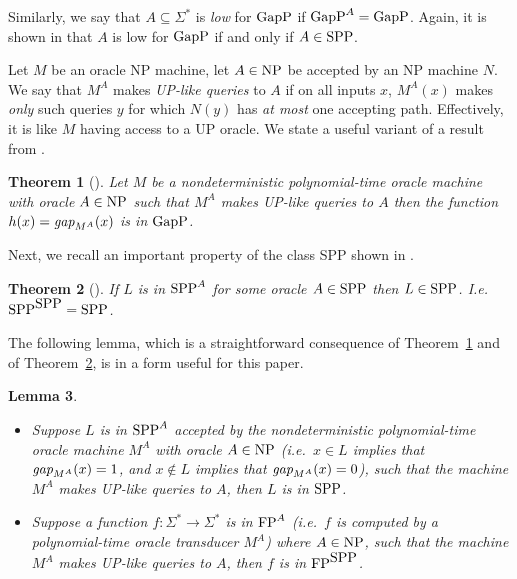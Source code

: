 \documentclass{article}
\newtheorem{theorem}{Theorem}[section]
\newtheorem{lemma}[theorem]{Lemma}
\newcommand{\GapP}{\mbox{\rm GapP}}
\newcommand{\NP}{\mbox{\rm NP}}
\newcommand{\FP}{\mbox{\rm FP}}
\newcommand{\SPP}{\mbox{\rm SPP}}
\newcommand{\gap}{\mbox{\it gap}}
\begin{document}
Similarly, we say that $A \subseteq \Sigma^*$ is {\em low} for $\GapP$
if $\GapP^A=\GapP$. Again, it is shown in \cite{fenner91gapdefinable}
that $A$ is low for $\GapP$ if and only if $A\in\SPP$.

Let $M$ be an oracle NP machine, let $A\in\NP$ be accepted by an NP
machine $N$. We say that $M^A$ makes {\em UP-like queries} to $A$ if
on all inputs $x$, $M^A(x)$ makes {\em only} such queries $y$ for
which $N(y)$ has {\em at most} one accepting path.  Effectively, it is
like $M$ having access to a UP oracle. We state a useful variant of a
result from \cite{kobler92graph,gi-book}.

\begin{theorem}[\cite{kobler92graph}]\label{KST-theorem}
  Let $M$ be a nondeterministic polynomial-time oracle machine with
  oracle $A\in\NP$ such that $M^A$ makes UP-like queries to $A$ then
  the function $h(x)=\gap_{M^{A}}(x)$ is in $\GapP$.
\end{theorem} 

Next, we recall an important property of the class SPP shown in
\cite{fenner91gapdefinable}.

\begin{theorem}[\cite{fenner91gapdefinable}]\label{SPP-self-low}
  If $L$ is in $\SPP^A$ for some oracle $A\in\SPP$ then $L\in\SPP$.
  I.e.\ $\SPP^{\SPP}=\SPP$.
\end{theorem}

The following lemma, which is a straightforward consequence of
Theorem~\ref{KST-theorem} and of Theorem~\ref{SPP-self-low}, is in a
form useful for this paper.

\begin{lemma}\label{KST-cor}\mbox{}
\begin{itemize}
\item Suppose $L$ is in $\SPP^A$ accepted by the nondeterministic
  polynomial-time oracle machine $M^A$ with oracle $A\in\NP$ (i.e.\ 
  $x\in L$ implies that $\gap_{M^A}(x)=1$, and $x\not\in L$ implies
  that $\gap_{M^A}(x)=0$), such that the machine $M^A$ makes UP-like
  queries to $A$, then $L$ is in $\SPP$.
\item Suppose a function $f:\Sigma^*\rightarrow\Sigma^*$ is in $\FP^A$
  (i.e.\ $f$ is computed by a polynomial-time oracle transducer $M^A$)
  where $A\in\NP$, such that the machine $M^A$ makes UP-like queries
  to $A$, then $f$ is in $\FP^{\SPP}$.
\end{itemize}
\end{lemma}
\end{document}
